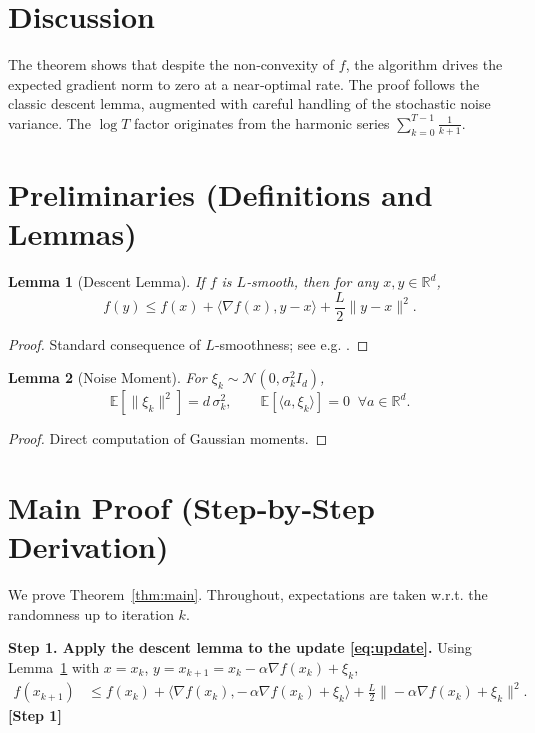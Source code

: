 \documentclass{article}
\newtheorem{lemma}{Lemma}
\newcommand{\E}{\mathbb{E}}
\newcommand{\R}{\mathbb{R}}
\begin{document}
\section*{Discussion}
The theorem shows that despite the non‑convexity of $f$, the algorithm drives the expected gradient norm to zero at a near‑optimal rate. The proof follows the classic descent lemma, augmented with careful handling of the stochastic noise variance. The $\log T$ factor originates from the harmonic series $\sum_{k=0}^{T-1}\tfrac{1}{k+1}$.

\newpage
\section*{Preliminaries (Definitions and Lemmas)}
\begin{lemma}[Descent Lemma]\label{lem:descent}
If $f$ is $L$‑smooth, then for any $x,y\in\R^{d}$,
\[
f(y)\le f(x)+\langle\nabla f(x),y-x\rangle+\frac{L}{2}\|y-x\|^{2}.
\]
\end{lemma}
\begin{proof}
Standard consequence of $L$‑smoothness; see e.g. \cite{Nesterov2004}. \qedhere
\end{proof}

\begin{lemma}[Noise Moment]\label{lem:noise}
For $\xi_{k}\sim\mathcal N(0,\sigma_{k}^{2}I_{d})$,
\[
\E[\|\xi_{k}\|^{2}]=d\,\sigma_{k}^{2},\qquad
\E[\langle a,\xi_{k}\rangle]=0\;\;\forall a\in\R^{d}.
\]
\end{lemma}
\begin{proof}
Direct computation of Gaussian moments. \qedhere
\end{proof}

\section*{Main Proof (Step‑by‑Step Derivation)}
We prove Theorem~\ref{thm:main}. Throughout, expectations are taken w.r.t. the randomness up to iteration $k$.

\noindent\textbf{Step 1. Apply the descent lemma to the update \eqref{eq:update}.}  
Using Lemma~\ref{lem:descent} with $x=x_{k}$, $y=x_{k+1}=x_{k}-\alpha\nabla f(x_{k})+\xi_{k}$,
\begin{align}
f(x_{k+1})
&\le f(x_{k})+\big\langle\nabla f(x_{k}),-\,\alpha\nabla f(x_{k})+\xi_{k}\big\rangle
      +\frac{L}{2}\big\|-\alpha\nabla f(x_{k})+\xi_{k}\big\|^{2}. \tag{1}
\end{align}
\noindent\textbf{[Step 1]}
\end{document}
